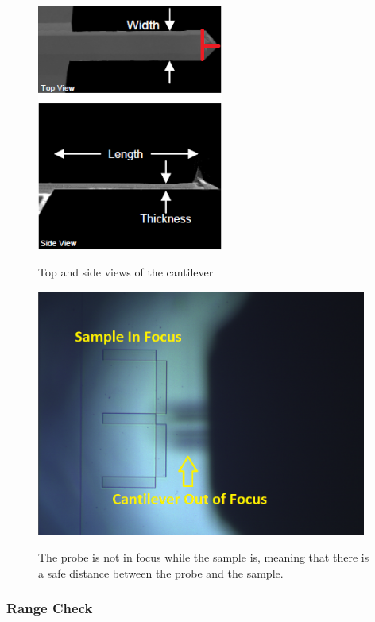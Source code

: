 \documentclass{../lab}
\begin{document}
\begin{figure}[H]
    \centering
    \begin{minipage}{0.35\linewidth}
    \centering
    \href{http://experimentationlab.berkeley.edu/sites/default/files/AFMImages/26.png}{\includegraphics[height=230pt]{images/26.png}}
    \caption{Top and side views of the cantilever}
    \end{minipage}\hfill
    \begin{minipage}{0.6\linewidth}
    \centering
    \href{http://experimentationlab.berkeley.edu/sites/default/files/AFMImages/probe_unfocused1_0.png}{\includegraphics[height=230pt]{images/probe_unfocused1_0.png}}
    \caption{The probe is not in focus while the sample is, meaning that there is a safe distance between the probe and the sample.}
    \label{fig:ProbeUnfocused}
    \end{minipage}
\end{figure}

\subsubsection{Range Check}
\label{subsubsec:RangeCheck}
\end{document}

